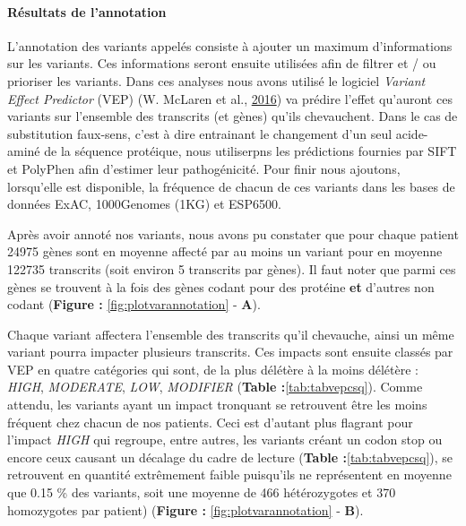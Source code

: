 \documentclass[12pt,twoside]{reedthesis}
\theoremstyle{definition}
\theoremstyle{definition}
\theoremstyle{remark}
\begin{document}
  \newpage
  
  \paragraph{Résultats de l'annotation}\label{resultats-de-lannotation}
  
  L'annotation des variants appelés consiste à ajouter un maximum
  d'informations sur les variants. Ces informations seront ensuite
  utilisées afin de filtrer et / ou prioriser les variants. Dans ces
  analyses nous avons utilisé le logiciel \emph{Variant Effect Predictor}
  (VEP) (W. McLaren et al., \protect\hyperlink{ref-McLaren2016}{2016}) va
  prédire l'effet qu'auront ces variants sur l'ensemble des transcrits (et
  gènes) qu'ils chevauchent. Dans le cas de substitution faux-sens, c'est
  à dire entrainant le changement d'un seul acide-aminé de la séquence
  protéique, nous utiliserpns les prédictions fournies par SIFT et
  PolyPhen afin d'estimer leur pathogénicité. Pour finir nous ajoutons,
  lorsqu'elle est disponible, la fréquence de chacun de ces variants dans
  les bases de données ExAC, 1000Genomes (1KG) et ESP6500.
  
  Après avoir annoté nos variants, nous avons pu constater que pour chaque
  patient 24975 gènes sont en moyenne affecté par au moins un variant pour
  en moyenne 122735 transcrits (soit environ 5 transcrits par gènes). Il
  faut noter que parmi ces gènes se trouvent à la fois des gènes codant
  pour des protéine \textbf{et} d'autres non codant (\textbf{Figure :
  }\ref{fig:plotvarannotation} - \textbf{A}).
  
  Chaque variant affectera l'ensemble des transcrits qu'il chevauche,
  ainsi un même variant pourra impacter plusieurs transcrits. Ces impacts
  sont ensuite classés par VEP en quatre catégories qui sont, de la plus
  délétère à la moins délétère : \emph{HIGH}, \emph{MODERATE}, \emph{LOW},
  \emph{MODIFIER} (\textbf{Table :}\ref{tab:tabvepcsq}). Comme attendu,
  les variants ayant un impact tronquant se retrouvent être les moins
  fréquent chez chacun de nos patients. Ceci est d'autant plus flagrant
  pour l'impact \emph{HIGH} qui regroupe, entre autres, les variants
  créant un codon stop ou encore ceux causant un décalage du cadre de
  lecture (\textbf{Table :}\ref{tab:tabvepcsq}), se retrouvent en quantité
  extrêmement faible puisqu'ils ne représentent en moyenne que 0.15 \% des
  variants, soit une moyenne de 466 hétérozygotes et 370 homozygotes par
  patient) (\textbf{Figure : }\ref{fig:plotvarannotation} - \textbf{B}).
  
\end{document}
